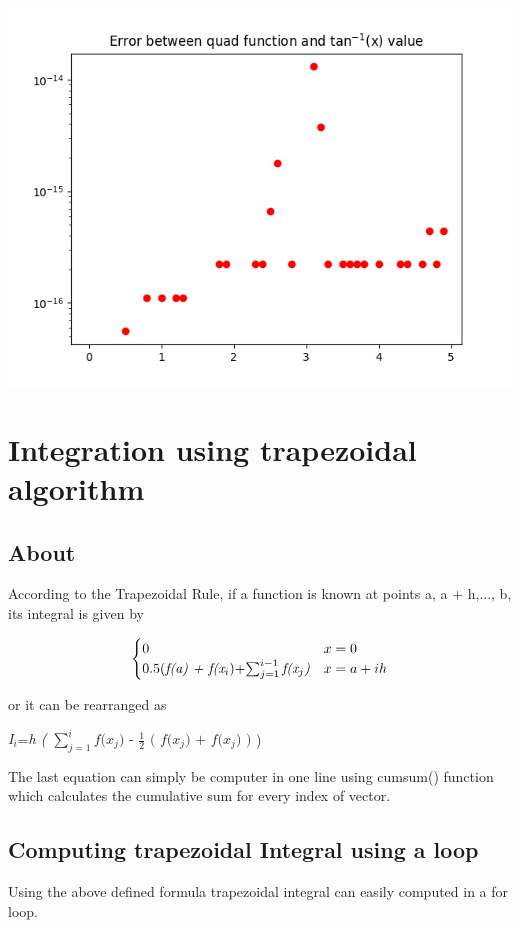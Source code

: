 \documentclass[letterpaper, 12pt]{article}
\begin{document}
\begin{multicols}{2}
\includegraphics[width=\columnwidth]{Figure_1-3.png}
\section{Integration using trapezoidal algorithm }
\subsection{About}
According to the Trapezoidal Rule, if a function is known at points a, a + h,..., b, its integral is
given by
\begin{center}
	\[ \begin{cases} 
      0 & x = 0 \\
      0.5( \textit{f(a) + f(x$_{i}$}) +  $$\sum_{j=1}^{i-1}\textit{f(x$_{j}$)} $$ &  x = a + ih \\
   \end{cases}
\]
\end{center}
or it can be rearranged as
\begin{center}
\vspace{1mm}
	\textit{I$_{i}$}=\textit{h ( $\sum_{j=1}^{i}\textit{f(x$_{j}$) - $\frac{1}{2}$ ( f(x$_{j}$) + f(x$_{j}$) )}$} )
\vspace{1mm}
\end{center}
The last equation can simply be computer in one line using cumsum() function which calculates the cumulative sum for every index of vector.
\subsection{Computing trapezoidal Integral using a loop}
Using the above defined formula trapezoidal integral can easily computed in a for loop.
\end{multicols}
\end{document}
